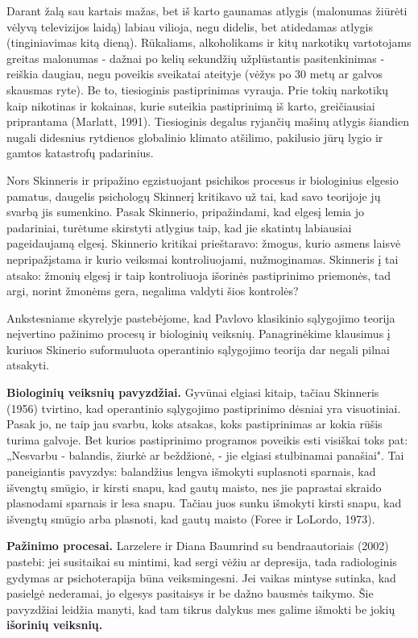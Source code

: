 \documentclass{article}
\begin{document}
Darant žalą sau kartais mažas, bet iš karto gaunamas atlygis (malonumas žiūrėti vėlyvą televizijos laidą) labiau vilioja, negu didelis, bet atidedamas atlygis (tinginiavimas kitą dieną). Rūkaliams, alkoholikams ir kitų narkotikų vartotojams
greitas malonumas - dažnai po kelių sekundžių užplūstantis pasitenkinimas - reiškia daugiau, negu poveikis sveikatai ateityje (vėžys po 30 metų ar galvos skausmas ryte). Be to, tiesioginis pastiprinimas vyrauja. Prie tokių narkotikų
kaip nikotinas ir kokainas, kurie suteikia pastiprinimą iš karto, greičiausiai priprantama (Marlatt, 1991). Tiesioginis degalus ryjančių mašinų atlygis šiandien nugali didesnius rytdienos globalinio klimato atšilimo, pakilusio jūrų lygio ir gamtos katastrofų padarinius.

Nors Skinneris ir pripažino egzistuojant psichikos procesus ir biologinius elgesio pamatus, daugelis psichologų Skinnerį kritikavo už tai, kad savo teorijoje jų svarbą jis sumenkino. Pasak Skinnerio, pripažindami, kad elgesį lemia jo padariniai, turėtume skirstyti atlygius taip, kad jie skatintų labiausiai pageidaujamą elgesį. Skinnerio kritikai prieštaravo: žmogus, kurio asmens laisvė nepripažįstama ir kurio veiksmai kontroliuojami, nužmoginamas. Skinneris į tai atsako: žmonių elgesį ir taip kontroliuoja išorinės pastiprinimo priemonės, tad argi, norint žmonėms gera, negalima valdyti šios kontrolės? 

Ankstesniame skyrelyje pastebėjome, kad Pavlovo klasikinio sąlygojimo teorija neįvertino pažinimo procesų ir biologinių veiksnių. Panagrinėkime klausimus į kuriuos Skinerio suformuluota operantinio sąlygojimo teorija dar negali pilnai atsakyti.

\textbf{Biologinių veiksnių pavyzdžiai.} 
Gyvūnai elgiasi kitaip, tačiau Skinneris (1956) tvirtino, kad operantinio sąlygojimo pastiprinimo dėsniai yra visuotiniai. Pasak jo, ne taip jau svarbu, koks
atsakas, koks pastiprinimas ar kokia rūšis turima galvoje. Bet kurios pastiprinimo programos poveikis esti visiškai toks pat: „Nesvarbu - balandis, žiurkė ar beždžionė, - jie elgiasi stulbinamai panašiai". 
Tai paneigiantis pavyzdys: balandžius lengva išmokyti suplasnoti sparnais, kad išvengtų smūgio, ir kirsti snapu, kad
gautų maisto, nes jie paprastai skraido plasnodami sparnais ir lesa snapu. Tačiau juos sunku išmokyti kirsti snapu, kad išvengtų smūgio arba plasnoti, kad gautų maisto (Foree ir LoLordo, 1973).

\textbf{Pažinimo procesai.}
Larzelere ir Diana Baumrind su bendraautoriais (2002) pastebi: jei susitaikai su mintimi, kad sergi vėžiu ar depresija, tada radiologinis gydymas ar psichoterapija būna veiksmingesni. Jei vaikas mintyse sutinka, kad pasielgė nederamai, jo elgesys pasitaisys ir be dažno bausmės taikymo. Šie pavyzdžiai leidžia manyti, kad tam tikrus dalykus mes galime išmokti be jokių \textbf{išorinių veiksnių.} 
\end{document}
